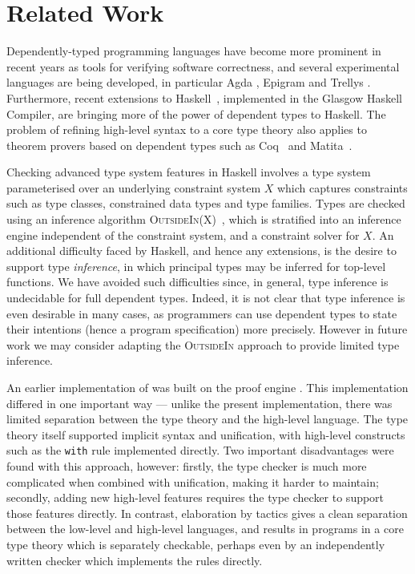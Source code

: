 \section{Related Work}

\label{sect:related}

Dependently-typed programming languages have become more prominent in recent
years as tools for verifying software correctness, and several experimental
languages are being developed, in particular Agda \cite{norell2007thesis},
Epigram \cite{McBride2004a,Levitation2010} and Trellys \cite{Kimmell2012}.
Furthermore, recent extensions to Haskell~\cite{Vytiniotis2011}, implemented in the
Glasgow Haskell Compiler, are bringing more of the power of dependent types to
Haskell. The problem of refining high-level syntax to a core type theory also
applies to theorem provers based on dependent types such as
Coq~\cite{Bertot2004} and Matita~\cite{Asperti2011}.

Checking advanced type system features in Haskell involves a type system
parameterised over an underlying constraint system $X$ which captures
constraints such as type classes, constrained data types and type families.
Types are checked using an inference algorithm
\textsc{OutsideIn(X)}~\cite{Vytiniotis2011}, which is stratified into an
inference engine independent of the constraint
system, and a constraint solver for $X$. An additional difficulty faced by
Haskell, and hence any extensions, is the desire to support type \emph{inference}, in
which principal types may be inferred for top-level functions. We have avoided
such difficulties since, in general, type
inference is undecidable for full dependent types. Indeed, it is not clear
that type inference is even desirable in many cases, as programmers
can use dependent types to state their intentions (hence a program
specification) more precisely. However in future work we
may consider adapting the \textsc{OutsideIn} approach to provide limited type
inference.

An earlier implementation of \Idris{} was built on the \Ivor{} proof engine
\cite{Brady2006b}. This implementation differed in one important way --- unlike
the present implementation, there was limited separation between the type
theory and the high-level language. The type theory itself supported implicit
syntax and unification, with high-level constructs such as the \texttt{with}
rule implemented directly. Two important disadvantages were found with this
approach, however: firstly, the type checker is much more complicated when
combined with unification, making it harder to maintain; secondly, adding new
high-level features requires the type checker to support those features
directly. In contrast, elaboration by tactics gives a clean separation between
the low-level and high-level languages, and results in programs in a core
type theory which is separately checkable, perhaps even by an independently
written checker which implements the \TT{} rules directly.

